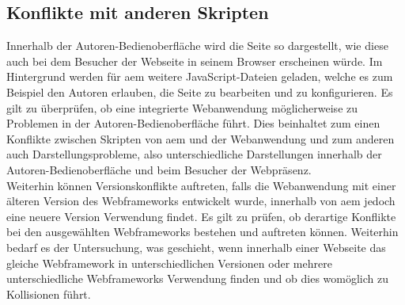 \subsection{Konflikte mit anderen Skripten}

Innerhalb der Autoren-Bedienoberfläche wird die Seite so dargestellt, wie diese auch bei dem Besucher der Webseite in seinem Browser erscheinen würde. Im Hintergrund werden für \ac{aem} weitere JavaScript-Dateien geladen, welche es zum Beispiel den Autoren erlauben, die Seite zu bearbeiten und zu konfigurieren. Es gilt zu überprüfen, ob eine integrierte Webanwendung möglicherweise zu Problemen in der Autoren-Bedienoberfläche führt. Dies beinhaltet zum einen Konflikte zwischen Skripten von \ac{aem} und der Webanwendung und zum anderen auch Darstellungsprobleme, also unterschiedliche Darstellungen innerhalb der Autoren-Bedienoberfläche und beim Besucher der Webpräsenz. \\
Weiterhin können Versionskonflikte auftreten, falls die Webanwendung mit einer älteren Version des Webframeworks entwickelt wurde, innerhalb von \ac{aem} jedoch eine neuere Version Verwendung findet. Es gilt zu prüfen, ob derartige Konflikte bei den ausgewählten Webframeworks bestehen und auftreten können. Weiterhin bedarf es der Untersuchung, was geschieht, wenn innerhalb einer Webseite das gleiche Webframework in unterschiedlichen Versionen oder mehrere unterschiedliche Webframeworks Verwendung finden und ob dies womöglich zu Kollisionen führt.